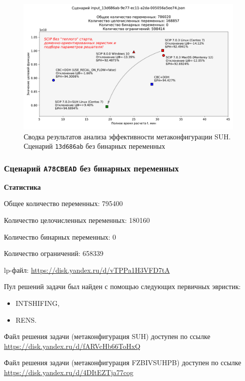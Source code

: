 \documentclass[%
	11pt,
	a4paper,
	utf8,
		]{article}
\begin{document}
\begin{figure}[!h]
	\centering
	\includegraphics[scale=0.6]{figures/summary_13d686ab.pdf}
	\caption{Сводка результатов анализа эффективности метаконфигурации SUH. \\Сценарий \texttt{13d686ab} без бинарных переменных}\label{fig:summary_13d686ab}
\end{figure}

\subsubsection{Сценарий \texttt{A78CBEAD} без бинарных переменных}

\textbf{Статистика}\vspace*{1mm}

Общее количество переменных: 795400

Количество целочисленных переменных: 180160

Количество бинарных переменных: 0

Количество ограничений: 658339

lp-файл: \url{https://disk.yandex.ru/d/vTPPa1H3VFD7tA}

Пул решений задачи был найден с помощью следующих первичных эвристик:
\begin{itemize}
	\item INTSHIFING,
	
	\item RENS.
\end{itemize}

Файл решения задачи (метаконфигурация SUH) доступен по ссылке \url{https://disk.yandex.ru/d/fARVcHb66ToHxQ}

Файл решения задачи (метаконфигурация FZBIVSUHPB) доступен по ссылке \url{https://disk.yandex.ru/d/4DItEZTja77cog}
\end{document}

